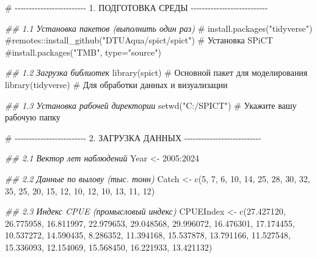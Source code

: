 \documentclass[
  letterpaper,
  DIV=11,
  numbers=noendperiod]{scrreprt}
\newenvironment{Shaded}{\begin{snugshade}}{\end{snugshade}}
\newcommand{\CommentTok}[1]{\textcolor[rgb]{0.37,0.37,0.37}{#1}}
\newcommand{\DecValTok}[1]{\textcolor[rgb]{0.68,0.00,0.00}{#1}}
\newcommand{\DocumentationTok}[1]{\textcolor[rgb]{0.37,0.37,0.37}{\textit{#1}}}
\newcommand{\FloatTok}[1]{\textcolor[rgb]{0.68,0.00,0.00}{#1}}
\newcommand{\FunctionTok}[1]{\textcolor[rgb]{0.28,0.35,0.67}{#1}}
\newcommand{\NormalTok}[1]{\textcolor[rgb]{0.00,0.23,0.31}{#1}}
\newcommand{\OtherTok}[1]{\textcolor[rgb]{0.00,0.23,0.31}{#1}}
\newcommand{\SpecialCharTok}[1]{\textcolor[rgb]{0.37,0.37,0.37}{#1}}
\newcommand{\StringTok}[1]{\textcolor[rgb]{0.13,0.47,0.30}{#1}}
\begin{document}
\begin{Shaded}
\begin{Highlighting}[]
\CommentTok{\# {-}{-}{-}{-}{-}{-}{-}{-}{-}{-}{-}{-}{-}{-}{-}{-}{-}{-}{-}{-}{-}{-}{-}{-}{-} 1. ПОДГОТОВКА СРЕДЫ {-}{-}{-}{-}{-}{-}{-}{-}{-}{-}{-}{-}{-}{-}{-}{-}{-}{-}{-}{-}{-}{-}{-}{-}{-}{-}{-}}

\DocumentationTok{\#\# 1.1 Установка пакетов (выполнить один раз)}
\CommentTok{\# install.packages("tidyverse")}
\CommentTok{\#remotes::install\_github("DTUAqua/spict/spict") \# Установка SPiCT}
\CommentTok{\#install.packages("TMB", type="source")}

\DocumentationTok{\#\# 1.2 Загрузка библиотек}
\FunctionTok{library}\NormalTok{(spict)   }\CommentTok{\# Основной пакет для моделирования}
\FunctionTok{library}\NormalTok{(tidyverse) }\CommentTok{\# Для обработки данных и визуализации}


\DocumentationTok{\#\# 1.3 Установка рабочей директории}
\FunctionTok{setwd}\NormalTok{(}\StringTok{"C:/SPICT"}\NormalTok{) }\CommentTok{\# Укажите вашу рабочую папку}


\CommentTok{\# {-}{-}{-}{-}{-}{-}{-}{-}{-}{-}{-}{-}{-}{-}{-}{-}{-}{-}{-}{-}{-}{-}{-}{-}{-} 2. ЗАГРУЗКА ДАННЫХ {-}{-}{-}{-}{-}{-}{-}{-}{-}{-}{-}{-}{-}{-}{-}{-}{-}{-}{-}{-}{-}{-}{-}{-}{-}{-}{-}}

\DocumentationTok{\#\# 2.1 Вектор лет наблюдений}
\NormalTok{Year }\OtherTok{\textless{}{-}} \DecValTok{2005}\SpecialCharTok{:}\DecValTok{2024}

\DocumentationTok{\#\# 2.2 Данные по вылову (тыс. тонн)}
\NormalTok{Catch }\OtherTok{\textless{}{-}} \FunctionTok{c}\NormalTok{(}\DecValTok{5}\NormalTok{,  }\DecValTok{7}\NormalTok{,  }\DecValTok{6}\NormalTok{, }\DecValTok{10}\NormalTok{, }\DecValTok{14}\NormalTok{, }\DecValTok{25}\NormalTok{, }\DecValTok{28}\NormalTok{, }\DecValTok{30}\NormalTok{, }\DecValTok{32}\NormalTok{, }\DecValTok{35}\NormalTok{, }\DecValTok{25}\NormalTok{, }\DecValTok{20}\NormalTok{, }\DecValTok{15}\NormalTok{, }\DecValTok{12}\NormalTok{, }\DecValTok{10}\NormalTok{, }\DecValTok{12}\NormalTok{, }\DecValTok{10}\NormalTok{, }\DecValTok{13}\NormalTok{, }\DecValTok{11}\NormalTok{, }\DecValTok{12}\NormalTok{)}

\DocumentationTok{\#\# 2.3 Индекс CPUE (промысловый индекс)}
\NormalTok{CPUEIndex }\OtherTok{\textless{}{-}} \FunctionTok{c}\NormalTok{(}\FloatTok{27.427120}\NormalTok{, }\FloatTok{26.775958}\NormalTok{, }\FloatTok{16.811997}\NormalTok{, }\FloatTok{22.979653}\NormalTok{, }\FloatTok{29.048568}\NormalTok{, }\FloatTok{29.996072}\NormalTok{, }\FloatTok{16.476301}\NormalTok{,}
\FloatTok{17.174455}\NormalTok{, }\FloatTok{10.537272}\NormalTok{, }\FloatTok{14.590435}\NormalTok{,  }\FloatTok{8.286352}\NormalTok{, }\FloatTok{11.394168}\NormalTok{, }\FloatTok{15.537878}\NormalTok{, }\FloatTok{13.791166}\NormalTok{,}
\FloatTok{11.527548}\NormalTok{, }\FloatTok{15.336093}\NormalTok{, }\FloatTok{12.154069}\NormalTok{, }\FloatTok{15.568450}\NormalTok{, }\FloatTok{16.221933}\NormalTok{, }\FloatTok{13.421132}\NormalTok{)}


\end{Highlighting}
\end{Shaded}
\end{document}
